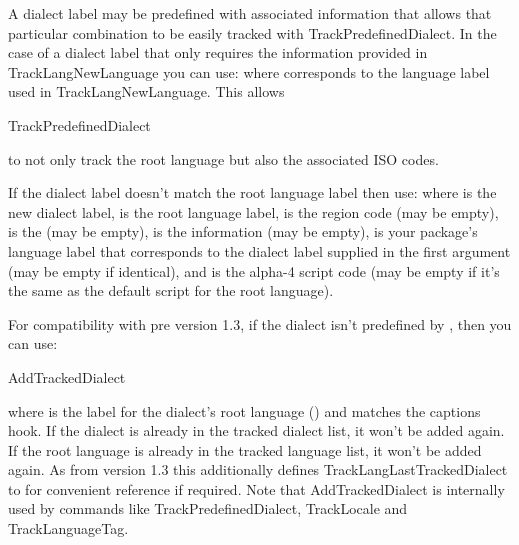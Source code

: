 \documentclass[titlepage=false,oneside,
 fontsize=12pt,captions=tableheading]{scrbook}
\begin{document}
A dialect label may be predefined with associated information that
allows that particular combination to be easily tracked with
\gls{TrackPredefinedDialect}. In the case of a dialect label that
only requires the information provided in \gls{TrackLangNewLanguage}
you can use:
where  corresponds to the language label used in
\gls{TrackLangNewLanguage}. This allows
\begin{compactcodebox*}
\gls{TrackPredefinedDialect}
\end{compactcodebox*}
to not only track the root language but also the associated ISO codes.

If the dialect label doesn't match the root language label then use:
where  is the new  dialect label,
 is the  root language label,
 is the  region code (may be empty),
 is the  (may be empty), 
is the  information (may be empty),  is your
package's language label that corresponds to the 
dialect label supplied in the first argument (may be empty if
identical), and  is the  alpha-4 script code
(may be empty if it's the same as the default script for the root
language).

For compatibility with pre version 1.3, 
if the dialect isn't predefined by
, then you can use:
\begin{compactcodebox*}
\gls{AddTrackedDialect}
\end{compactcodebox*}
where  is the label for the dialect's root
language () and  matches
the captions hook. If the dialect is already in the tracked dialect
list, it won't be added again. If the root language is already in
the tracked language list, it won't be added again. As from version
1.3 this additionally defines
\gls{TrackLangLastTrackedDialect}
to  for convenient reference if required.
Note that \gls{AddTrackedDialect} is internally used by commands like
\gls{TrackPredefinedDialect}, \gls{TrackLocale} and
\gls{TrackLanguageTag}.
\end{document}
